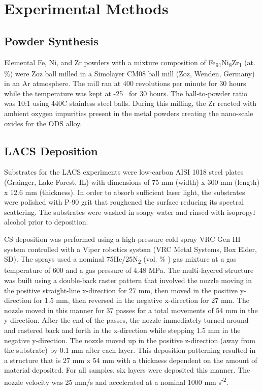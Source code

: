	\section*{Experimental Methods}

		\subsection*{Powder Synthesis} 

			Elemental Fe, Ni, and Zr powders with a mixture composition of Fe\textsubscript{91}Ni\textsubscript{8}Zr\textsubscript{1 }(at. $\%$) were Zoz ball milled in a Simolayer CM08 ball mill (Zoz, Wenden, Germany) in an Ar atmosphere. The mill ran at 400 revolutions per minute for 30 hours while the temperature was kept at -25 \celsius{} for 30 hours. The ball-to-powder ratio was 10:1 using 440C stainless steel balls. During this milling, the Zr reacted with ambient oxygen impurities present in the metal powders creating the nano-scale oxides for the ODS alloy.



		\subsection*{LACS Deposition}



			Substrates for the LACS experiments were low-carbon AISI 1018 steel plates (Grainger, Lake Forest, IL) with dimensions of 75 mm (width) x 300 mm (length) x 12.6 mm (thickness). In order to absorb sufficient laser light, the substrates were polished with P-90 grit that roughened the surface reducing its spectral scattering. The substrates were washed in soapy water and rinsed with isopropyl alcohol prior to deposition.
		
		
		
			CS deposition was performed using a high-pressure cold spray VRC Gen III system controlled with a Viper robotics system (VRC Metal Systems, Box Elder, SD). The sprays used a nominal 75He/25N\textsubscript{2 }(vol. $\%$ ) gas mixture at a gas temperature of 600 \celsius{} and a gas pressure of 4.48 MPa. The multi-layered structure was built using a double-back raster pattern that involved the nozzle moving in the positive straight-line x-direction for 27 mm, then moved in the positive y-direction for 1.5 mm, then reversed in the negative x-direction for 27 mm. The nozzle moved in this manner for 37 passes for a total movements of 54 mm in the y-direction. After the end of the passes, the nozzle immediately turned around and rastered back and forth in the x-direction while stepping 1.5 mm in the negative y-direction. The nozzle moved up in the positive z-direction (away from the substrate) by 0.1 mm after each layer. This deposition patterning resulted in a structure that is 27 mm x 54 mm with a thickness dependent on the amount of material deposited. For all samples, six layers were deposited this manner. The nozzle velocity was 25 mm/s and accelerated at a nominal 1000 mm s\textsuperscript{-2}.
		
